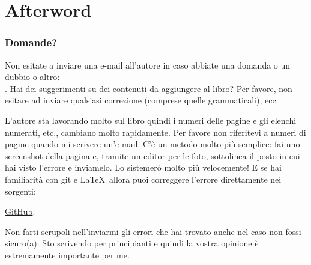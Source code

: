 \part*{Afterword}

\section{Domande?}

Non esitate a inviare una e-mail all'autore in caso abbiate una domanda o un dubbio o altro: \\
\GTT{<\EMAIL>}.
Hai dei suggerimenti su dei contenuti da aggiungere al libro?
Per favore, non esitare ad inviare qualsiasi correzione (comprese quelle grammaticali), ecc.

L'autore sta lavorando molto sul libro quindi i numeri delle pagine e gli elenchi numerati, etc., cambiano molto rapidamente.
Per favore non riferitevi a numeri di pagine quando mi scrivere un'e-mail.
C'è un metodo molto più semplice: fai uno screenshot della pagina e, tramite un editor per le foto, sottolinea il posto in cui hai visto l'errore
e inviamelo. Lo sistemerò molto più velocemente!
E se hai familiarità con git e \LaTeX\, allora puoi correggere l'errore direttamente nei sorgenti:

\href{http://go.yurichev.com/17089}{GitHub}.

Non farti scrupoli nell'inviarmi gli errori che hai trovato anche nel caso non fossi sicuro(a).
Sto scrivendo per principianti e quindi la vostra opinione è estremamente importante per me.
